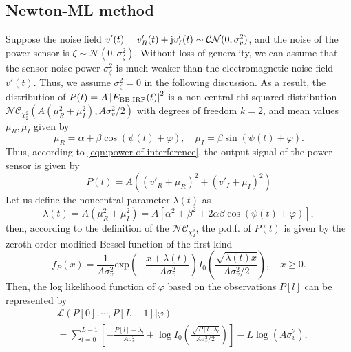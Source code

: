 \documentclass[journal,twocolumn]{IEEEtran}
\theoremstyle{nonumberplain}
\def \exp {\text{exp}}
\def \nc {\mathcal{NC}}
\begin{document}
\subsection{Newton-ML method}  \label{ML method}
    Suppose the noise field $v'(t)=v'_R(t) + {\rm j}v'_I(t)\sim \mathcal{CN}(0, \sigma_v^2)$, and the noise of the power sensor is $\zeta \sim \mathcal{N}(0, \sigma_{\zeta}^2)$. 
    Without loss of generality, we can assume that the sensor noise power $\sigma_{\zeta}^2$ is much weaker than the electromagnetic noise field $v'(t)$.
    Thus, we assume $\sigma_{\zeta}^2=0$ in the following discussion.  
    As a result, the distribution of $P(t) = A\left|E_{{\rm BB}, {\rm IRF}}(t)\right|^2$ is a non-central chi-squared distribution $\nc_{\chi_2^2}(A(\mu_{R}^2+\mu_{I}^2),  A\sigma_v^2/2)$ with degrees of freedom $k=2$, and mean values $\mu_{R}, \mu_{I}$ given by
    \begin{equation}
        \mu_{R} = \alpha + \beta \cos(\psi(t)+\varphi),\quad  \mu_{I}  = \beta \sin(\psi(t)+\varphi).
        \label{chi2 distribution mean values}
    \end{equation}
    Thus, according to \eqref{eqn:power of interference}, the output signal of the power sensor is given by 
    \begin{equation}
        P(t)  = A\left((v'_{R} + \mu_{R})^2 + (v'_{I} + \mu_{I})^2 \right)
        \label{eqn:sensor power}
    \end{equation}
    Let us define the noncentral parameter $\lambda(t)$ as
    \begin{equation}
        \lambda(t)  = A(\mu_{R}^2 + \mu_{I}^2) = A\left[\alpha^{2}+\beta^{2}+2\alpha\beta\cos\left(\psi(t)+\varphi\right)\right],
    \end{equation}
    then, according to the definition of the $\nc_{\chi_2^2}$, the p.d.f. of $P(t)$ is given by the zeroth-order modified Bessel function of the first kind 
    \begin{equation}
        f_{P}(x) = \frac{1}{A\sigma_{v}^2} \exp\left(-\frac{x+\lambda(t)}{A\sigma_v^2}\right)I_{0}\left(\frac{\sqrt{\lambda(t) x}}{A\sigma_v^2/2}\right),\quad x \geq 0.
        \label{ML single observation}
    \end{equation}
    Then, the log likelihood function of $\varphi$ based on the observations $P[l]$ can be represented by
    \ifx\onecol\undefined
        \begin{equation}
            \begin{aligned}
                & \mathcal{L}(P[0],\cdots,P[L-1] | \varphi) \\
                & = \sum_{l=0}^{L-1}\left[-\frac{P[l] + \lambda_l}{A\sigma_v^2} + \log I_0\left(\frac{\sqrt{P[l] \lambda_l}}{A\sigma_v^2/2}\right)\right] - L\log(A\sigma_v^2),
            \end{aligned}
            \label{ML likelihood}
        \end{equation}
\end{document}
